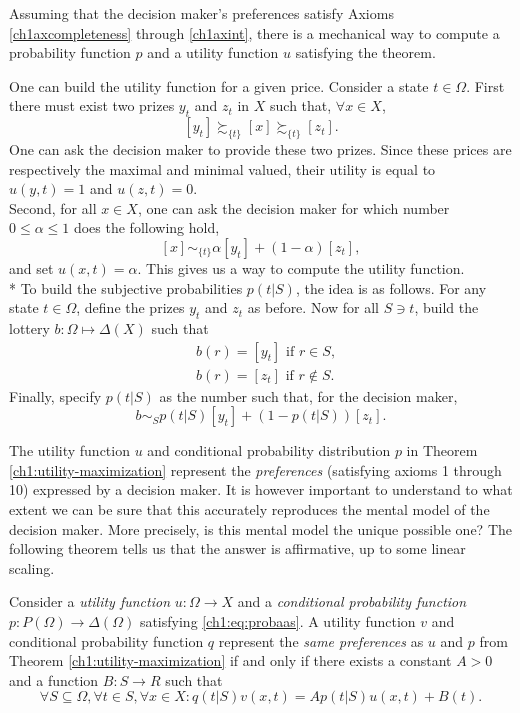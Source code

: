 \begin{example}
Assuming that the decision maker's preferences satisfy Axioms \ref{ch1axcompleteness} through \ref{ch1axint}, there is a mechanical way to compute a probability function $p$ and a utility function $u$ satisfying the theorem.

One can build the utility function for a given price. Consider a state $t \in \Omega$. First there must exist two prizes $y_t$ and $z_t$ in $X$ such that, $\forall x \in X$,
$$ [y_t]\succsim_{\{t\}} [x] \succsim_{\{t\}} [z_t].$$
One can ask the decision maker to provide these two prizes. Since these prices are respectively the maximal and minimal valued, their utility is equal to $u(y,t)=1$ and
$u(z,t)=0$.\\
Second, for all $x \in X$, one can ask the decision maker for which number $0 \leq \alpha \leq 1 $ does the following hold,
$$ [x] \sim_{\{t\}} \alpha[y_t] + (1-\alpha) [z_t],$$
and set $u(x,t) = \alpha.$
This gives us a way to compute the utility function. \\*
To build the subjective probabilities $p(t|S)$, the idea is as follows. For any state $t\in \Omega$, define the prizes $y_t$ and $z_t$ as before. Now for all $S \ni t$, build the lottery $b : \Omega \mapsto \Delta(X)$ such that
$$
\begin{aligned}
& b(r) = [y_t] \text{ if $r \in S$}, \\
& b(r) = [z_t] \text{ if $r \not \in S$}.
\end{aligned}
$$
Finally, specify $p(t|S)$ as the number such that, for the decision maker,
$$ b \sim_S p(t|S) [y_t] + (1-p(t|S)) [z_t].$$
\end{example}


The utility function $u$ and conditional probability distribution $p$ in Theorem \ref{ch1:utility-maximization} represent the \emph{preferences} (satisfying axioms 1 through 10) expressed by a decision maker.
It is however important to understand to what extent  we can be sure that this accurately reproduces the mental model of the decision maker. More precisely, is this mental model the unique possible one?  The following theorem tells us that the answer is affirmative, up to some linear scaling.

\begin{theorem}
Consider a \emph{utility function} $u : \Omega \rightarrow X$ and a \emph{conditional probability function} $p : P(\Omega) \rightarrow \Delta(\Omega)$ satisfying \ref{ch1:eq:probaas}.
A utility function $v$ and conditional probability function $q$ represent the \emph{same preferences} as $u$ and $p$ from Theorem \ref{ch1:utility-maximization} if and only if there  exists a constant $A > 0$ and a function $B : S \rightarrow R$ such that
$$ \forall S \subseteq \Omega, \forall t \in S, \forall x \in X: q(t|S) v(x,t) = Ap(t|S)u(x,t) + B(t). $$
\label{chap1:thm:Equivalent}
\end{theorem}


